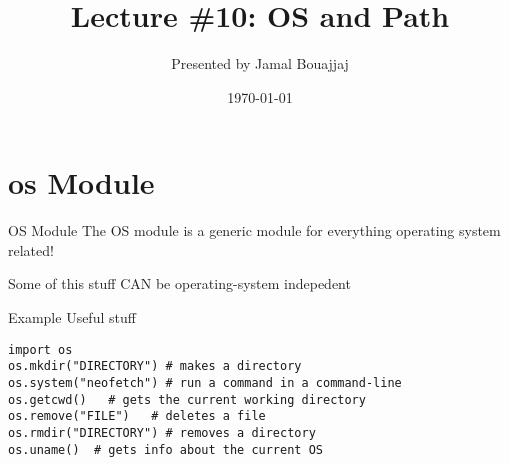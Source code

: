 %
%



\title{Lecture \#10: OS and Path}
\date{\today}
\author{Presented by Jamal Bouajjaj}

\makeatletter
{}%
\makeatother



\maketitle

\section{os Module}

\begin{frame}{OS Module}
  The OS module is a generic module for everything operating system related!

  Some of this stuff CAN be operating-system indepedent
\end{frame}

\begin{frame}[containsverbatim]{Example Useful stuff}
\begin{verbatim}
import os
os.mkdir("DIRECTORY") # makes a directory
os.system("neofetch") # run a command in a command-line
os.getcwd()   # gets the current working directory
os.remove("FILE")   # deletes a file
os.rmdir("DIRECTORY") # removes a directory
os.uname()  # gets info about the current OS
\end{verbatim}
\end{frame}


